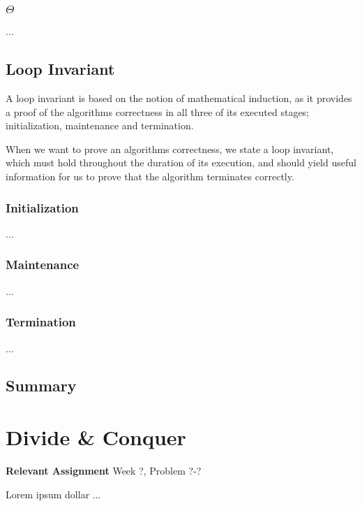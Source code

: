 \documentclass[11pt,english]{book}
\begin{document}
\subsection{$\Theta$}
\label{ch:definitions|sec:asymptotic-notation|sub:theta}
...

\section{Loop Invariant}
\label{ch:definitions|sec:loop-invariant}
A loop invariant is based on the notion of mathematical induction, as it
provides a proof of the algorithms correctness in all three of its executed
stages; initialization, maintenance and termination.

When we want to prove an algorithms correctness, we state a loop invariant,
which must hold throughout the duration of its execution, and should yield
useful information for us to prove that the algorithm terminates correctly.

\subsection{Initialization}
...

\subsection{Maintenance}
...

\subsection{Termination}
...

\section{Summary}
\label{ch:definitions|sec:asymptotic-notation|sec:summary}


\chapter{Divide \& Conquer}
\label{ch:divideandconquer}

\textbf{Relevant Assignment} Week ?, Problem ?-?
\vspace{0.38in}

\noindent Lorem ipsum dollar ...
\end{document}
